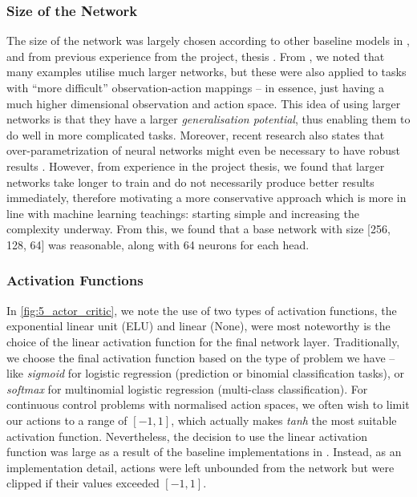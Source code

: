 \subsubsection{Size of the Network}
The size of the network was largely chosen according to other baseline models in \cite{IsaacGym}, and from previous experience from the project, thesis \cite{project_thesis}. From \cite{IsaacGym}, we noted that many examples utilise much larger networks, but these were also applied to tasks with ``more difficult'' observation-action mappings \cite{shadowHand, AMPMotionPriors} -- in essence, just having a much higher dimensional observation and action space.
This idea of using larger networks is that they have a larger \textit{generalisation potential}, thus enabling them to do well in more complicated tasks. Moreover, recent research also states that over-parametrization of neural networks might even be necessary to have robust results \cite{bubeck2021aLawOfRobustness}.
However, from experience in the project thesis, we found that larger networks take longer to train and do not necessarily produce better results immediately, therefore motivating a more conservative approach which is more in line with machine learning teachings: starting simple and increasing the complexity underway. From this, we found that a base network with size [256, 128, 64] was reasonable, along with 64 neurons for each head.

\subsubsection{Activation Functions}
In \cref{fig:5_actor_critic}, we note the use of two types of activation functions, the exponential linear unit (ELU) and linear (None), were most noteworthy is the choice of the linear activation function for the final network layer. Traditionally, we choose the final activation function based on the type of problem we have -- like \textit{sigmoid} for logistic regression (prediction or binomial classification tasks), or \textit{softmax} for multinomial logistic regression (multi-class classification). For continuous control problems with normalised action spaces, we often wish to limit our actions to a range of $[-1, 1]$, which actually makes \textit{tanh} the most suitable activation function. Nevertheless, the decision to use the linear activation function was large as a result of the baseline implementations in \cite{IsaacGym}. Instead, as an implementation detail, actions were left unbounded from the network but were clipped if their values exceeded $[-1, 1]$. 

